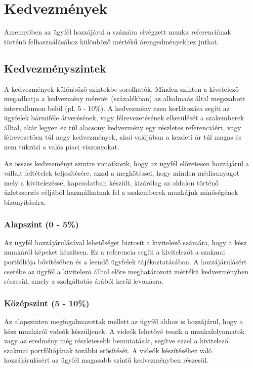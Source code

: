 \section{Kedvezmények}

Amennyiben az ügyfél hozzájárul a számára elvégzett munka
referenciának történő felhasználásához különböző mértékű árengedményekhez juthat.

\subsection{Kedvezményszintek}
A kedvezmények különböző szintekbe sorolhatók. Minden szinten a kivetelező megadhatja
a kedvezmény méretét (százalékban) az alkalmaás által megszabott intervallumon belül (pl. 5 - 10\%). 
A kedvezmény ezen korlátozása segíti az ügyfelek bármiféle átverésének, vagy félrevezetésének elkerülését a
szakemberek álltal, akár legyen ez túl alacsony kedvezmény egy részletes referenciáért,
vagy félrevezetően túl nagy kedvezmények, ahol valójában a kezdeti ár túl magas és nem tükrözi a valós piaci viszonyokat.

Az összes kedvezményi szintre vonatkozik, hogy az ügyfél előzetesen hozzájárul a vállalt feltételek teljesítésére, azzal a megkötéssel, hogy
minden médiaanyagot mely a kivitelezéssel kapcsolatban készült, kizárólag az oldalon történő üzletszerzés céljából használhatnak fel a szakemberek
munkájuk minőségének bizonyítására.

\subsubsection{Alapszint (0 - 5\%)} 
Az ügyfél hozzájárulásával lehetőséget biztosít a kivitelező számára, hogy a kész munkáról képeket készítsen. Ez a referencia segíti a kivitelezőt a szakmai portfóliója bővítésében és a leendő ügyfelek tájékoztatásában.
A hozzájárulásért cserébe az ügyfél a kivitelezö álltal előre meghatározott mértékü kedvezményben részesül, amely a szolgáltatás árából kerül levonásra.
\subsubsection{Középszint (5 - 10\%)}
Az alapszinten megfogalmazottak mellett az ügyfél ahhoz is hozzájárul, hogy a kész munkáról videók készüljenek. A videók lehetővé teszik a munkafolyamatok vagy az eredmény még részletesebb bemutatását, segítve ezzel a kivitelező szakmai portfóliójának további erősítését.
A videók készítéséhez való hozzájárulásért az ügyfél magasabb szintű kedvezményben részesül.

